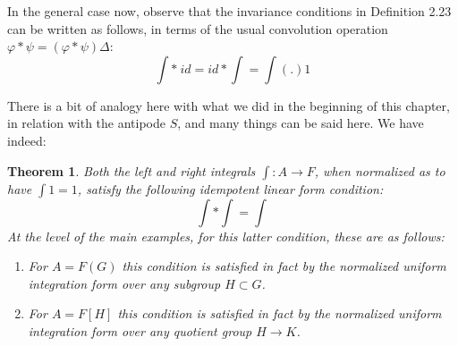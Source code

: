 \documentclass[12pt]{amsbook}
\newtheorem{theorem}{Theorem}[chapter]
\begin{document}
\bigskip

In the general case now, observe that the invariance conditions in Definition 2.23 can be written as follows, in terms of the usual convolution operation $\varphi*\psi=(\varphi*\psi)\Delta$:
$$\int*\ id=id*\!\int=\int(.)1$$

There is a bit of analogy here with what we did in the beginning of this chapter, in relation with the antipode $S$, and many things can be said here. We have indeed:


\begin{theorem}
Both the left and right integrals $\int:A\to F$, when normalized as to have $\int 1=1$, satisfy the following idempotent linear form condition:
$$\int*\int=\int$$
At the level of the main examples, for this latter condition, these are as follows:
\begin{enumerate}
\item For $A=F(G)$ this condition is satisfied in fact by the normalized uniform integration form over any subgroup $H\subset G$.

\item For $A=F[H]$ this condition is satisfied in fact by the normalized uniform integration form over any quotient group $H\to K$.
\end{enumerate}
\end{theorem}
\end{document}

